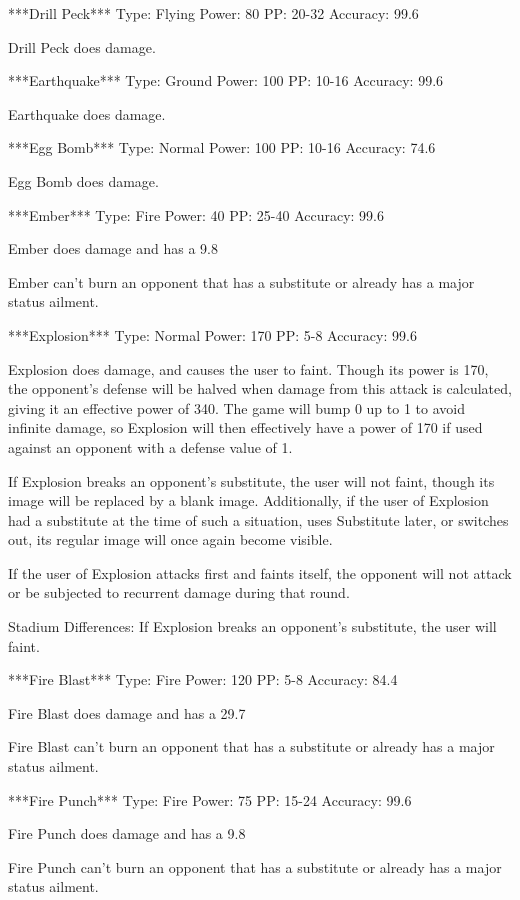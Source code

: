 \documentclass[reprint, aps, prl, paper=A4]{revtex4-1}
\begin{document}
***Drill Peck***
Type: Flying
Power: 80
PP: 20-32
Accuracy: 99.6%

Drill Peck does damage.


***Earthquake***
Type: Ground
Power: 100
PP: 10-16
Accuracy: 99.6%

Earthquake does damage.


***Egg Bomb***
Type: Normal
Power: 100
PP: 10-16
Accuracy: 74.6%

Egg Bomb does damage.


***Ember***
Type: Fire
Power: 40
PP: 25-40
Accuracy: 99.6%

Ember does damage and has a 9.8%

Ember can't burn an opponent that has a substitute or already has a major status ailment.


***Explosion***
Type: Normal
Power: 170
PP: 5-8
Accuracy: 99.6%

Explosion does damage, and causes the user to faint. Though its power is 170, the opponent's
defense will be halved when damage from this attack is calculated, giving it an effective power
of 340. The game will bump 0 up to 1 to avoid infinite damage, so Explosion will then
effectively have a power of 170 if used against an opponent with a defense value of 1.

If Explosion breaks an opponent's substitute, the user will not faint, though its image will be
replaced by a blank image. Additionally, if the user of Explosion had a substitute at the time
of such a situation, uses Substitute later, or switches out, its regular image will once again
become visible.

If the user of Explosion attacks first and faints itself, the opponent will not attack or be
subjected to recurrent damage during that round.

Stadium Differences:
If Explosion breaks an opponent's substitute, the user will faint.


***Fire Blast***
Type: Fire
Power: 120
PP: 5-8
Accuracy: 84.4%

Fire Blast does damage and has a 29.7%

Fire Blast can't burn an opponent that has a substitute or already has a major status ailment.


***Fire Punch***
Type: Fire
Power: 75
PP: 15-24
Accuracy: 99.6%

Fire Punch does damage and has a 9.8%

Fire Punch can't burn an opponent that has a substitute or already has a major status ailment.
\end{document}
